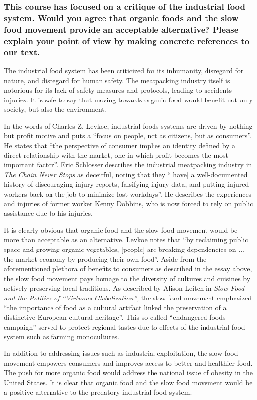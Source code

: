 \documentclass{article}
\begin{document}
\subsubsection*{This course has focused on a critique of the industrial food
system. Would you agree that organic foods and the slow food movement provide
an acceptable alternative? Please explain your point of view by making concrete
references to our text.}
The industrial food system has been criticized for its inhumanity, disregard
for nature, and disregard for human safety. The meatpacking industry itself is
notorious for its lack of safety measures and protocols, leading to accidents
injuries. It is safe to say that moving towards organic food would benefit not
only society, but also the environment. \par
In the words of Charles Z. Levkoe, industrial foods systems are driven by
nothing but profit motive and puts a ``focus on people, not as citizens, but as
consumers''. He states that ``the perspective of consumer implies an identity
defined by a direct relationship with the market, one in which profit becomes
the most important factor''. Eric Schlosser describes the industrial
meatpacking industry in \textit{The Chain Never Stops} as deceitful, noting
that they ``[have] a well-documented history of discouraging injury reports,
falsifying injury data, and putting injured workers back on the job to minimize
lost workdays''. He describes the experiences and injuries of former worker
Kenny Dobbins, who is now forced to rely on public assistance due to his
injuries. \par
It is clearly obvious that organic food and the slow food movement would be
more than acceptable as an alternative. Levkoe notes that ``by reclaiming
public space and growing organic vegetables, [people] are breaking dependencies
on ... the market economy by producing their own food''. Aside from the
aforementioned plethora of benefits to consumers as described in the essay
above, the slow food movement pays homage to the diversity of cultures
and cuisines by actively preserving local traditions. As described by Alison
Leitch in \textit{Slow Food and the Politics of ``Virtuous Globalization''},
the slow food movement emphasized ``the importance of food as a cultural
artifact linked the preservation of a distinctive European cultural heritage''.
This so-called ``endangered foods campaign'' served to protect regional tastes
due to effects of the industrial food system such as farming monocultures. \par
In addition to addressing issues such as industrial exploitation, the slow food
movement empowers consumers and improves access to better and healthier food.
The push for more organic food would address the national issue of obesity in
the United States. It is clear that organic food and the slow food movement
would be a positive alternative to the predatory industrial food system.
\end{document}

